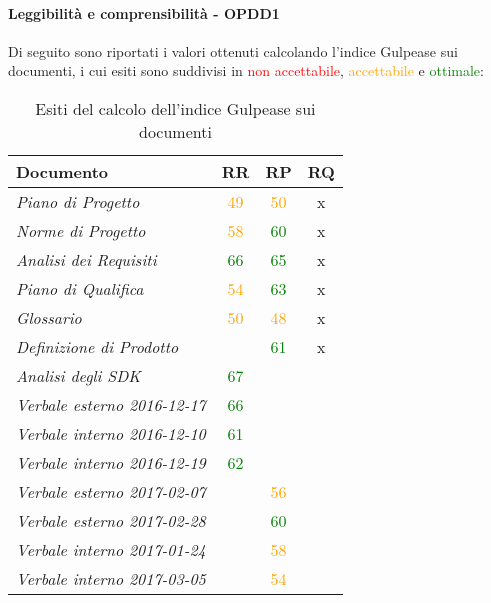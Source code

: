 \documentclass[PdQ.tex]{subfiles}
\begin{document}
		\paragraph{Leggibilità e comprensibilità - OPDD1}
				Di seguito sono riportati i valori ottenuti calcolando l'indice Gulpease sui documenti, i cui esiti sono suddivisi in \textcolor{red}{non accettabile}, \textcolor{orange}{accettabile} e \textcolor{green}{ottimale}:
				\begin{table}[h]
				\centering
				\begin{tabular}{l c c c}
					\hline
					\rule[-0.3cm]{0cm}{0.8cm}
					\textbf{Documento} & \textbf{RR} & \textbf{RP} & \textbf{RQ}\\
					\hline
					\rule[0cm]{0cm}{0.4cm}
					\textit{Piano di Progetto} & \textcolor{orange}{49} & \textcolor{orange}{50} & x \\
					\rule[0cm]{0cm}{0.4cm}
					\textit{Norme di Progetto}& \textcolor{orange}{58} & \textcolor{green}{60} & x \\
					\rule[0cm]{0cm}{0.4cm}
					\textit{Analisi dei Requisiti} & \textcolor{green}{66} & \textcolor{green}{65} & x \\
					\rule[0cm]{0cm}{0.4cm}
					\textit{Piano di Qualifica} & \textcolor{orange}{54} & \textcolor{green}{63} & x \\
					\rule[0cm]{0cm}{0.4cm}
					\textit{Glossario} & \textcolor{orange}{50} & \textcolor{orange}{48} & x\\
					\rule[0cm]{0cm}{0.4cm}
					\textit{Definizione di Prodotto} & & \textcolor{green}{61} & x \\
					\rule[0cm]{0cm}{0.4cm}
					\textit{Analisi degli SDK} & \textcolor{green}{67} & &  \\
					\rule[0cm]{0cm}{0.4cm}
					\textit{Verbale esterno 2016-12-17} & \textcolor{green}{66} & & \\
					\rule[0cm]{0cm}{0.4cm}
					\textit{Verbale interno 2016-12-10} & \textcolor{green}{61} & & \\
					\rule[0cm]{0cm}{0.4cm}
					\textit{Verbale interno 2016-12-19} & \textcolor{green}{62} & & \\
					\rule[0cm]{0cm}{0.4cm}
					\textit{Verbale esterno 2017-02-07} & & \textcolor{orange}{56} & \\
					\rule[0cm]{0cm}{0.4cm}
					\textit{Verbale esterno 2017-02-28} & & \textcolor{green}{60} & \\
					\rule[0cm]{0cm}{0.4cm}
					\textit{Verbale interno 2017-01-24} & & \textcolor{orange}{58} & \\
					\rule[0cm]{0cm}{0.4cm}
					\textit{Verbale interno 2017-03-05} & & \textcolor{orange}{54} & \\
					\hline
				\end{tabular}
				\caption{Esiti del calcolo dell'indice Gulpease sui documenti}
			\end{table}
\end{document}
